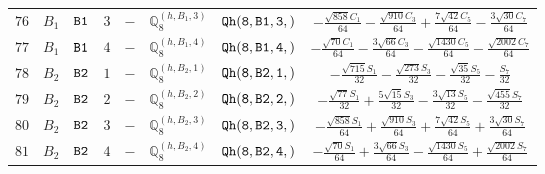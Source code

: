 \documentclass[fleqn,8pt]{jsarticle}
\begin{document}
\begin{table}[ht!]
\begin{center}
\begin{tabular}{cccccccc}
$ 76 $ & $ B_{1} $ & $ {\tt B1} $ & $ 3 $ & $ - $ & $ \mathbb{Q}_{8}^{(h,B_{1},3)} $ & $ {\tt Qh(8,B1,3,)} $ & $ - \frac{\sqrt{858} C_{1}}{64} - \frac{\sqrt{910} C_{3}}{64} + \frac{7 \sqrt{42} C_{5}}{64} - \frac{3 \sqrt{30} C_{7}}{64} $ \\
$ 77 $ & $ B_{1} $ & $ {\tt B1} $ & $ 4 $ & $ - $ & $ \mathbb{Q}_{8}^{(h,B_{1},4)} $ & $ {\tt Qh(8,B1,4,)} $ & $ - \frac{\sqrt{70} C_{1}}{64} - \frac{3 \sqrt{66} C_{3}}{64} - \frac{\sqrt{1430} C_{5}}{64} - \frac{\sqrt{2002} C_{7}}{64} $ \\
$ 78 $ & $ B_{2} $ & $ {\tt B2} $ & $ 1 $ & $ - $ & $ \mathbb{Q}_{8}^{(h,B_{2},1)} $ & $ {\tt Qh(8,B2,1,)} $ & $ - \frac{\sqrt{715} S_{1}}{32} - \frac{\sqrt{273} S_{3}}{32} - \frac{\sqrt{35} S_{5}}{32} - \frac{S_{7}}{32} $ \\
$ 79 $ & $ B_{2} $ & $ {\tt B2} $ & $ 2 $ & $ - $ & $ \mathbb{Q}_{8}^{(h,B_{2},2)} $ & $ {\tt Qh(8,B2,2,)} $ & $ - \frac{\sqrt{77} S_{1}}{32} + \frac{5 \sqrt{15} S_{3}}{32} - \frac{3 \sqrt{13} S_{5}}{32} - \frac{\sqrt{455} S_{7}}{32} $ \\
$ 80 $ & $ B_{2} $ & $ {\tt B2} $ & $ 3 $ & $ - $ & $ \mathbb{Q}_{8}^{(h,B_{2},3)} $ & $ {\tt Qh(8,B2,3,)} $ & $ - \frac{\sqrt{858} S_{1}}{64} + \frac{\sqrt{910} S_{3}}{64} + \frac{7 \sqrt{42} S_{5}}{64} + \frac{3 \sqrt{30} S_{7}}{64} $ \\
$ 81 $ & $ B_{2} $ & $ {\tt B2} $ & $ 4 $ & $ - $ & $ \mathbb{Q}_{8}^{(h,B_{2},4)} $ & $ {\tt Qh(8,B2,4,)} $ & $ - \frac{\sqrt{70} S_{1}}{64} + \frac{3 \sqrt{66} S_{3}}{64} - \frac{\sqrt{1430} S_{5}}{64} + \frac{\sqrt{2002} S_{7}}{64} $ \\
 \hline \hline
\end{tabular}
\end{center}
\end{table}
\end{document}
